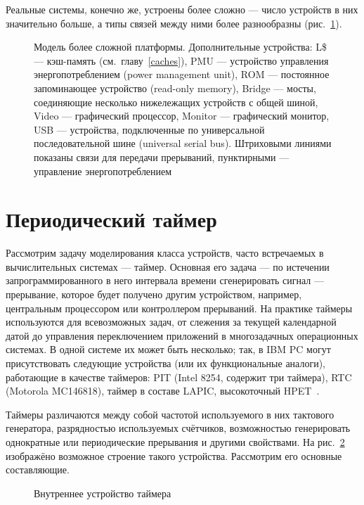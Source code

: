 Реальные системы, конечно же, устроены более сложно — число устройств в них значительно больше, а типы связей между ними более разнообразны (рис. \ref{fig:real-full-platform}).

\begin{figure}[htp]
    \centering
    \caption[Модель более сложной платформы]{Модель более сложной платформы. Дополнительные устройства: L\$ — кэш-память (см. главу \ref{caches}), PMU — устройство управления энергопотреблением (\abbr power management unit), ROM — постоянное запоминающее устройство (\abbr read-only memory), Bridge — мосты, соединяющие несколько нижележащих устройств с общей шиной, Video — графический процессор, Monitor — графический монитор, USB — устройства, подключенные по универсальной последовательной шине (\abbr universal serial bus). Штриховыми линиями показаны связи для передачи прерываний, пунктирными — управление энергопотреблением}
    \label{fig:real-full-platform}
\end{figure}

\section{Периодический таймер}

Рассмотрим задачу моделирования класса устройств, часто встречаемых в вычислительных системах — таймер. Основная его задача — по истечении запрограммированного в него интервала времени сгенерировать сигнал — прерывание, которое будет получено другим устройством, например, центральным процессором или контроллером прерываний. На практике таймеры используются для всевозможных задач, от слежения за текущей календарной датой до управления переключением приложений в многозадачных операционных системах. В одной системе их может быть несколько; так, в IBM PC могут присутствовать следующие устройства (или их функциональные аналоги), работающие в качестве таймеров: PIT (Intel 8254, содержит три таймера), RTC (Motorola MC146818), таймер в составе LAPIC, высокоточный HPET~\cite{hpet}.

Таймеры различаются между собой частотой используемого в них тактового генератора, разрядностью используемых счётчиков, возможностью генерировать однократные или периодические прерывания и другими свойствами.
На рис. \ref{fig:periodic-timer} изображёно возможное строение такого устройства. Рассмотрим его основные составляющие.

\begin{figure}[htp]
    \centering
    \caption[Внутреннее устройство таймера]{Внутреннее устройство таймера}
    \label{fig:periodic-timer}
\end{figure}

